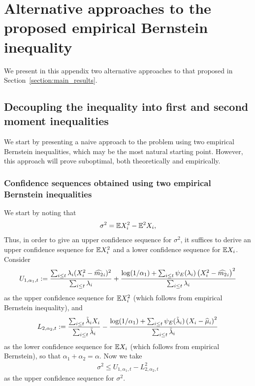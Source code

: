 \section{Alternative approaches to the proposed empirical Bernstein inequality} \label{section:alternative_approaches}

We present in this appendix two alternative approaches to that proposed in Section~\ref{section:main_results}. 


\subsection{Decoupling the inequality into first and second moment inequalities} \label{section:naive_approach_two_eb}

We start by presenting a naive approach to the problem using two empirical Bernstein inequalities, which may be the most natural starting point. However, this approach will prove suboptimal, both theoretically and empirically.


\subsubsection{Confidence sequences obtained using two empirical Bernstein inequalities} 
We start by noting that
\begin{align*}
    \sigma^2 = \mathbb{E} X_i^2 - \mathbb{E}^2X_i,
\end{align*}
Thus, in order to give an upper confidence sequence for $\sigma^2$, it suffices to derive an upper confidence sequence for $\mathbb{E} X_i^2$ and a lower confidence sequence for $\mathbb{E} X_i$. Consider
\begin{align*}
    U_{1, \alpha_1, t} :=  \frac{\sum_{i \leq t}\lambda_i (X_i^2 - \widehat {m_2}_i)^2}{\sum_{i \leq t} \lambda_i} + \frac{\log(1/\alpha_1) + \sum_{i \leq t}\psi_E(\lambda_i) \left( X_i ^2 - \widehat {m_2}_i \right)^2}{\sum_{i \leq t} \lambda_i} 
\end{align*}
as the upper confidence sequence for $\mathbb{E} X_i^2$ (which follows from empirical Bernstein inequality), and 
\begin{align*}
    L_{2, \alpha_2, t} :=   \frac{\sum_{i \leq t} \tilde \lambda_i X_i}{\sum_{i \leq t} \tilde \lambda_i} - \frac{\log(1/\alpha_1) + \sum_{i \leq t}\psi_E(\tilde\lambda_i) \left( X_i - \widehat \mu_i \right)^2}{\sum_{i \leq t} \tilde \lambda_i} 
\end{align*}
as the lower confidence sequence for $\mathbb{E} X_i$ (which follows from empirical Bernstein), so that $\alpha_1 + \alpha_2 = \alpha$. Now we take
\begin{align}
    \sigma^2 \leq U_{1, \alpha_1, t} - L^2_{2, \alpha_2, t}
\end{align}
as the upper confidence sequence for $\sigma^2$.

